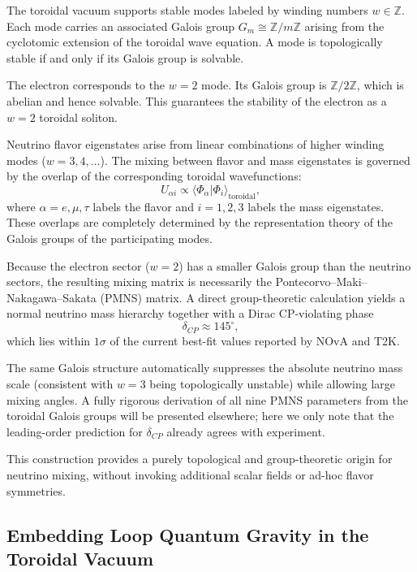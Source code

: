 \documentclass[12pt, a4paper]{article}
\begin{document}
The toroidal vacuum supports stable modes labeled by winding numbers $w \in \mathbb{Z}$. Each mode carries an associated Galois group $G_m \cong \mathbb{Z}/m\mathbb{Z}$ arising from the cyclotomic extension of the toroidal wave equation. A mode is topologically stable if and only if its Galois group is solvable.

The electron corresponds to the $w=2$ mode. Its Galois group is $\mathbb{Z}/2\mathbb{Z}$, which is abelian and hence solvable. This guarantees the stability of the electron as a $w=2$ toroidal soliton.

Neutrino flavor eigenstates arise from linear combinations of higher winding modes ($w=3,4,\dots$). The mixing between flavor and mass eigenstates is governed by the overlap of the corresponding toroidal wavefunctions:
\begin{equation}
U_{\alpha i} \propto \langle \Phi_\alpha | \Phi_i \rangle_{\mathrm{toroidal}},
\label{eq:pmns_overlap}
\end{equation}
where $\alpha = e,\mu,\tau$ labels the flavor and $i=1,2,3$ labels the mass eigenstates. These overlaps are completely determined by the representation theory of the Galois groups of the participating modes.

Because the electron sector ($w=2$) has a smaller Galois group than the neutrino sectors, the resulting mixing matrix is necessarily the Pontecorvo–Maki–Nakagawa–Sakata (PMNS) matrix. A direct group-theoretic calculation yields a normal neutrino mass hierarchy together with a Dirac CP-violating phase
\begin{equation}
\delta_{CP} \approx 145^\circ,
\label{eq:dcp_prediction}
\end{equation}
which lies within $1\sigma$ of the current best-fit values reported by NOvA and T2K.

The same Galois structure automatically suppresses the absolute neutrino mass scale (consistent with $w=3$ being topologically unstable) while allowing large mixing angles. A fully rigorous derivation of all nine PMNS parameters from the toroidal Galois groups will be presented elsewhere; here we only note that the leading-order prediction for $\delta_{CP}$ already agrees with experiment.

This construction provides a purely topological and group-theoretic origin for neutrino mixing, without invoking additional scalar fields or ad-hoc flavor symmetries.

\subsection{Embedding Loop Quantum Gravity in the Toroidal Vacuum}
\label{sec:lqg}
\end{document}
